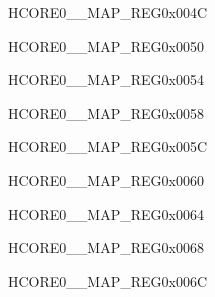 \begin{register}{H}{CORE0\_\_MAP\_REG}{0x004C}\label{regdesc:CORE0LPSYSREGINTMAPREG}
\end{register}\vspace{-3em}


\begin{register}{H}{CORE0\_\_MAP\_REG}{0x0050}\label{regdesc:CORE0LPHUKINTMAPREG}
\end{register}\vspace{-3em}


\begin{register}{H}{CORE0\_\_MAP\_REG}{0x0054}\label{regdesc:CORE0SYSICMINTMAPREG}
\end{register}\vspace{-3em}


\begin{register}{H}{CORE0\_\_MAP\_REG}{0x0058}\label{regdesc:CORE0USBDEVICEINTMAPREG}
\end{register}\vspace{-3em}


\begin{register}{H}{CORE0\_\_MAP\_REG}{0x005C}\label{regdesc:CORE0SDIOHOSTINTMAPREG}
\end{register}\vspace{-3em}


\begin{register}{H}{CORE0\_\_MAP\_REG}{0x0060}\label{regdesc:CORE0AXIDMACINTMAPREG}
\end{register}\vspace{-3em}


\begin{register}{H}{CORE0\_\_MAP\_REG}{0x0064}\label{regdesc:CORE0SPI2INTMAPREG}
\end{register}\vspace{-3em}


\begin{register}{H}{CORE0\_\_MAP\_REG}{0x0068}\label{regdesc:CORE0SPI3INTMAPREG}
\end{register}\vspace{-3em}


\begin{register}{H}{CORE0\_\_MAP\_REG}{0x006C}\label{regdesc:CORE0I2S0INTMAPREG}
\end{register}\vspace{-3em}


